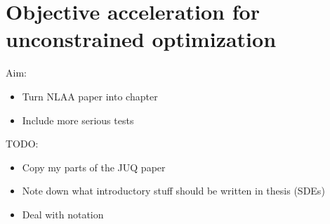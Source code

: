 \documentclass[main.tex]{subfiles}
\begin{document}
\chapter{Objective acceleration for unconstrained optimization}


Aim:
\begin{itemize}
\item Turn NLAA paper into chapter
\item Include more serious tests
\end{itemize}

TODO:
\begin{itemize}
\item Copy my parts of the JUQ paper
\item Note down what introductory stuff should be written in thesis (SDEs)
\item Deal with notation
\end{itemize}

\biblio{} %
\end{document}
